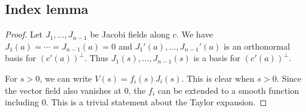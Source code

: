\subsection{Index lemma}
\begin{proof}
Let $J_1,\ldots, J_{n-1}$ be Jacobi fields along $c$. We have $J_1(a)=\cdots =J_{n-1}(a)=0$ and $J_1'(a),\ldots, J_{n-1}'(a)$ is an orthonormal basis for $(c'(a))^{\perp}$. Thus $J_1(s),\ldots, J_{n-1}(s)$ is a basis for $(c'(a))^{\perp}$.

For $s>0$, we can write $V(s)=f_i(s)J_i(s)$. This is clear when $s>0$. %
Since the vector field also vanishes at 0, the $f_i$ can be extended to a smooth function including 0. %
This is a trivial statement about the Taylor expansion.


\end{proof}
